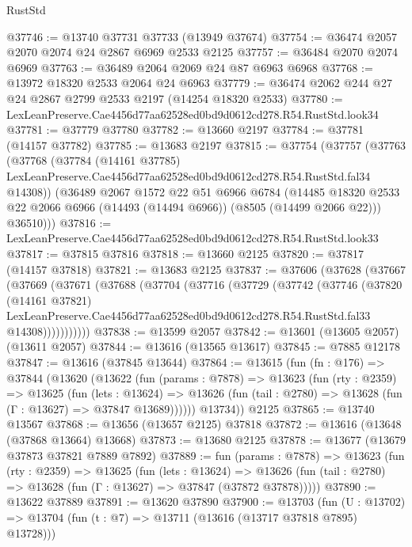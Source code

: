 \begin{lexlean}{RustStd}
\begin{coremodule}
@37746 := @13740 @37731 @37733 (@13949 @37674)
@37754 := @36474 @2057 @2070 @2074 @24 @2867 @6969 @2533 @2125
@37757 := @36484 @2070 @2074 @6969
@37763 := @36489 @2064 @2069 @24 @87 @6963 @6968
@37768 := @13972 @18320 @2533 @2064 @24 @6963
@37779 := @36474 @2062 @244 @27 @24 @2867 @2799 @2533 @2197 (@14254 @18320 @2533)
@37780 := LexLeanPreserve.Cae4456d77aa62528ed0bd9d0612cd278.R54.RustStd.look34
@37781 := @37779 @37780
@37782 := @13660 @2197
@37784 := @37781 (@14157 @37782)
@37785 := @13683 @2197
@37815 := @37754
    (@37757
      (@37763
        (@37768
          (@37784
            (@14161 @37785)
            LexLeanPreserve.Cae4456d77aa62528ed0bd9d0612cd278.R54.RustStd.fal34
            @14308))
        (@36489
          @2067
          @1572
          @22
          @51
          @6966
          @6784
          (@14485 @18320 @2533 @22 @2066 @6966 (@14493 (@14494 @6966)) (@8505 (@14499 @2066 @22)))
          @36510)))
@37816 := LexLeanPreserve.Cae4456d77aa62528ed0bd9d0612cd278.R54.RustStd.look33
@37817 := @37815 @37816
@37818 := @13660 @2125
@37820 := @37817 (@14157 @37818)
@37821 := @13683 @2125
@37837 := @37606
    (@37628
      (@37667
        (@37669
          (@37671
            (@37688
              (@37704
                (@37716
                  (@37729
                    (@37742
                      (@37746
                        (@37820
                          (@14161 @37821)
                          LexLeanPreserve.Cae4456d77aa62528ed0bd9d0612cd278.R54.RustStd.fal33
                          @14308)))))))))))
@37838 := @13599 @2057
@37842 := @13601 (@13605 @2057) (@13611 @2057)
@37844 := @13616 (@13565 @13617)
@37845 := @7885 @12178
@37847 := @13616 (@37845 @13644)
@37864 := @13615
    (fun (fn : @176) =>
    @37844
      (@13620
        (@13622
          (fun (params : @7878) =>
          @13623
            (fun (rty : @2359) =>
            @13625
              (fun (lets : @13624) =>
              @13626 (fun (tail : @2780) => @13628 (fun (Γ : @13627) => @37847 @13689))))))
        @13734))
    @2125
@37865 := @13740 @13567
@37868 := @13656 (@13657 @2125) @37818
@37872 := @13616 (@13648 (@37868 @13664) @13668)
@37873 := @13680 @2125
@37878 := @13677 (@13679 @37873 @37821 @7889 @7892)
@37889 := fun (params : @7878) =>
  @13623
    (fun (rty : @2359) =>
    @13625
      (fun (lets : @13624) =>
      @13626 (fun (tail : @2780) => @13628 (fun (Γ : @13627) => @37847 (@37872 @37878)))))
@37890 := @13622 @37889
@37891 := @13620 @37890
@37900 := @13703
    (fun (U : @13702) => @13704 (fun (t : @7) => @13711 (@13616 (@13717 @37818 @7895) @13728)))

\end{coremodule}
\end{lexlean}
